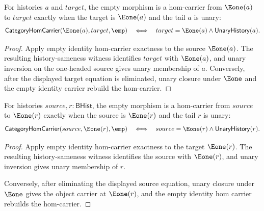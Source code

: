

\begin{theorem}
\label{thm:category-hom-carrier-e1-source-empty-morphism-iff}
For histories \(a\) and \(target\), the empty morphism is a hom-carrier from
\(\Eone(a)\) to \(target\) exactly when the target is \(\Eone(a)\) and the
tail \(a\) is unary:
$$
\mathsf{CategoryHomCarrier}(\Eone(a),target,\emp)
\quad\Longleftrightarrow\quad
target=\Eone(a)\wedge\mathsf{UnaryHistory}(a).
$$
\end{theorem}
\begin{proof}
Apply empty identity hom-carrier exactness to the source \(\Eone(a)\). The
resulting history-sameness witness identifies \(target\) with \(\Eone(a)\),
and unary inversion on the one-headed source gives unary membership of \(a\).
Conversely, after the displayed target equation is eliminated, unary closure
under \(\Eone\) and the empty identity carrier rebuild the hom-carrier.
\end{proof}

\begin{theorem}
\label{thm:category-hom-carrier-e1-target-empty-morphism}
For histories $source,r:\mathsf{BHist}$, the empty morphism is a hom-carrier
from $source$ to $\Eone(r)$ exactly when the source is $\Eone(r)$ and the tail
$r$ is unary:
$$
\mathsf{CategoryHomCarrier}(source,\Eone(r),\emp)
\quad\Longleftrightarrow\quad
source=\Eone(r)\wedge\mathsf{UnaryHistory}(r).
$$
\end{theorem}
\begin{proof}
Apply empty identity hom-carrier exactness to the target $\Eone(r)$. The
resulting history-sameness witness identifies the source with $\Eone(r)$, and
unary inversion gives unary membership of $r$.

Conversely, after eliminating the displayed source equation, unary closure
under $\Eone$ gives the object carrier at $\Eone(r)$, and the empty identity
hom carrier rebuilds the hom-carrier.
\end{proof}

